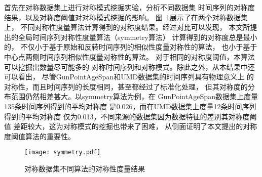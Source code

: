 首先在对称数据集上进行对称模式挖掘实验，分析不同数据集
时间序列的对称度结果，以及对称度阈值对对称模式挖掘的影响。
图~\ref{fig:symmetry_compare}展示了在两个对称数据集上，
不同对称性度量算法计算得到的对称度结果。经过对比可以发现，
本文所提出的全局时间序列对称性度量算法（symmetry算法）
计算得到的对称度总是最小的，
不仅小于基于原始和反转时间序列的相似性度量对称性的算法，
也小于基于中心点两侧时间序列相似性度量对称性的算法。
对于相同的对称度阈值，本算法可以挖掘出数量尽可能多的
对称时间序列和对称模式。除此之外，从本结果中还可以看出，
尽管GunPointAgeSpan和UMD数据集的时间序列具有物理意义上
的对称性，而且时间序列的长度相同，甚至都经过了标准化处理，
但其对称度的分布范围仍然相差甚大。以symmetry算法为例，在
GunPointAgeSpan数据集上度量135条时间序列得到的平均对称度
是0.026，而在UMD数据集上度量12条时间序列得到的平均对称度
仅为0.013，不同来源的数据集因为数据特征的差别其对称度阈值
差距较大，这为对称模式的挖掘也带来了困难，
从侧面证明了本文提出的对称度阈值算法的重要性。
\begin{figure}
  \centering
  \texttt{[image: symmetry.pdf]}
  \caption{对称数据集不同算法的对称性度量结果}
  \label{fig:symmetry_compare}
\end{figure}

